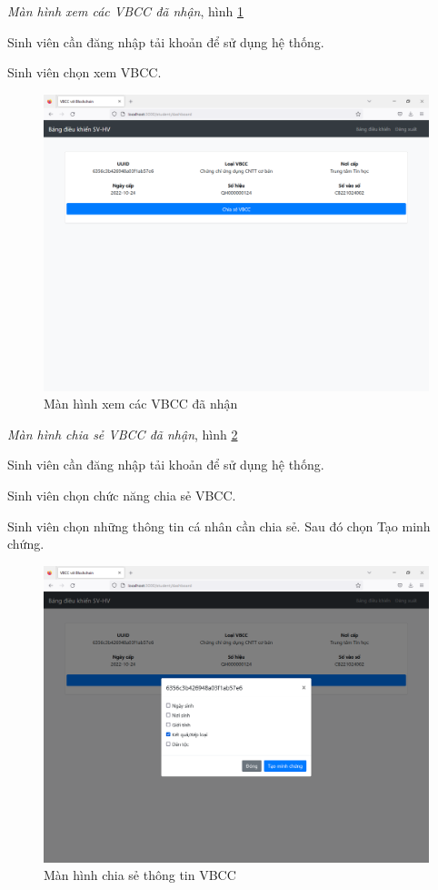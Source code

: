\emph{Màn hình xem các VBCC đã nhận}, hình \ref{fig:sv_hva}

Sinh viên cần đăng nhập tải khoản để sử dụng hệ thống.

Sinh viên chọn xem VBCC.
\begin{figure}[H]
\centering
\includegraphics[width=.9\linewidth]{img/sv_hva.PNG}
\caption{Màn hình xem các VBCC đã nhận}
\label{fig:sv_hva}
\end{figure}

\emph{Màn hình chia sẻ VBCC đã nhận}, hình \ref{fig:sv_chiase}

Sinh viên cần đăng nhập tải khoản để sử dụng hệ thống.

Sinh viên chọn chức năng chia sẻ VBCC.

Sinh viên chọn những thông tin cá nhân cần chia sẻ. Sau đó chọn Tạo minh chứng.

\begin{figure}[H]
\centering
\includegraphics[width=.9\linewidth]{img/sv_chiase.PNG}
\caption{Màn hình chia sẻ thông tin VBCC}
\label{fig:sv_chiase}
\end{figure}

